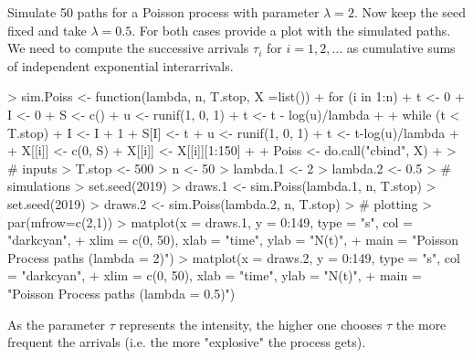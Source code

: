 \documentclass{article}
\begin{document}
Simulate 50 paths for a Poisson process with parameter $\lambda = 2$. Now keep the seed fixed and take $\lambda = 0.5$. For both cases provide a plot with the simulated paths.\\
We need to compute the successive arrivals $\tau_i$ for $i=1, 2, \dots$ as cumulative sums of independent exponential interarrivals.
\begin{Schunk}
\begin{Sinput}
> sim.Poiss <- function(lambda, n, T.stop, X =list()) {
+   for (i in 1:n) {
+     t <- 0
+     I <- 0
+     S <- c()
+     u <- runif(1, 0, 1)
+     t <- t - log(u)/lambda 
+     
+     while (t < T.stop) {
+       I <- I + 1
+       S[I] <- t
+       u <- runif(1, 0, 1)
+       t <- t-log(u)/lambda
+     }
+     X[[i]] <- c(0, S)
+     X[[i]] <- X[[i]][1:150]
+   }
+   Poiss <- do.call("cbind", X)
+ } 
> # inputs
> T.stop <- 500
> n <- 50 
> lambda.1 <- 2
> lambda.2 <- 0.5
> # simulations
> set.seed(2019)
> draws.1 <- sim.Poiss(lambda.1, n, T.stop)
> set.seed(2019)
> draws.2 <- sim.Poiss(lambda.2, n, T.stop)
> # plotting
> par(mfrow=c(2,1))
> matplot(x = draws.1, y = 0:149, type = "s", col = "darkcyan",
+         xlim = c(0, 50), xlab = "time", ylab = "N(t)",
+         main = "Poisson Process paths (lambda = 2)")
> matplot(x = draws.2, y = 0:149, type = "s", col = "darkcyan",
+         xlim = c(0, 50), xlab = "time", ylab = "N(t)",
+         main = "Poisson Process paths (lambda = 0.5)")
\end{Sinput}
\end{Schunk}
As the parameter $\tau$ represents the intensity, the higher one chooses $\tau$ the more frequent the arrivals (i.e. the more "explosive" the process gets).\\
\end{document}
